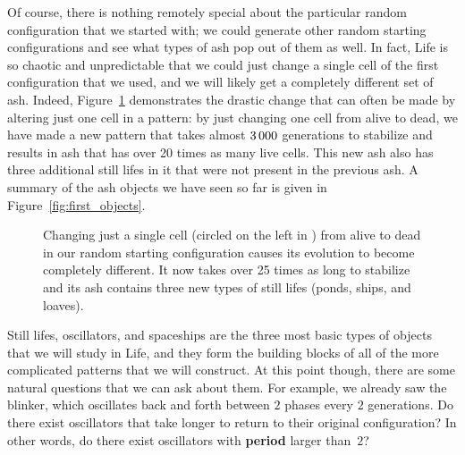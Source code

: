 Of course, there is nothing remotely special about the particular random configuration that we started with; we could generate other random starting configurations and see what types of ash pop out of them as well. In fact, Life is so chaotic and unpredictable that we could just change a single cell of the first configuration that we used, and we will likely get a completely different set of ash. Indeed, Figure~\ref{fig:random_2} demonstrates the drastic change that can often be made by altering just one cell in a pattern: by just changing one cell from alive to dead, we have made a new pattern that takes almost $3{\,}000$ generations to stabilize and results in ash that has over 20 times as many live cells. This new ash also has three additional still lifes in it that were not present in the previous ash. A summary of the ash objects we have seen so far is given in Figure~\ref{fig:first_objects}.

\begin{figure}[!ht]
	\centering{}
	\caption{Changing just a single cell (circled on the left in ) from alive to dead in our random starting configuration causes its evolution to become completely different. It now takes over 25 times as long to stabilize and its ash contains three new types of still lifes (ponds, ships, and loaves).}\label{fig:random_2}
\end{figure}

Still lifes, oscillators, and spaceships are the three most basic types of objects that we will study in Life, and they form the building blocks of all of the more complicated patterns that we will construct. At this point though, there are some natural questions that we can ask about them. For example, we already saw the blinker, which oscillates back and forth between $2$ phases every $2$ generations. Do there exist oscillators that take longer to return to their original configuration? In other words, do there exist oscillators with \textbf{period} larger than~$2$?


